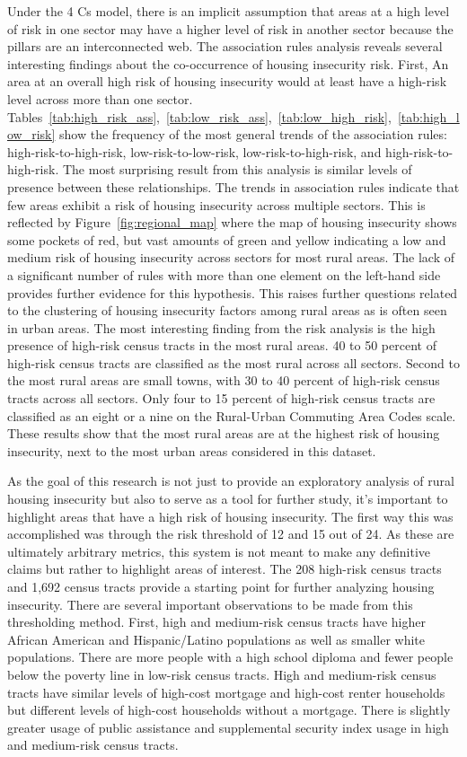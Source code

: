 Under the 4 Cs model, there is an implicit assumption that areas at a high level of risk in one sector may have a higher level of risk in another sector because the pillars are an interconnected web. The association rules analysis reveals several interesting findings about the co-occurrence of housing insecurity risk. First, An area at an overall high risk of housing insecurity would at least have a high-risk level across more than one sector. Tables~\ref{tab:high_risk_ass},~\ref{tab:low_risk_ass},~\ref{tab:low_high_risk},~\ref{tab:high_low_risk} show the frequency of the most general trends of the association rules: high-risk-to-high-risk, low-risk-to-low-risk, low-risk-to-high-risk, and high-risk-to-high-risk. The most surprising result from this analysis is similar levels of presence between these relationships. The trends in association rules indicate that few areas exhibit a risk of housing insecurity across multiple sectors. This is reflected by Figure~\ref{fig:regional_map} where the map of housing insecurity shows some pockets of red, but vast amounts of green and yellow indicating a low and medium risk of housing insecurity across sectors for most rural areas. The lack of a significant number of rules with more than one element on the left-hand side provides further evidence for this hypothesis. This raises further questions related to the clustering of housing insecurity factors among rural areas as is often seen in urban areas. The most interesting finding from the risk analysis is the high presence of high-risk census tracts in the most rural areas. 40 to 50 percent of high-risk census tracts are classified as the most rural across all sectors. Second to the most rural areas are small towns, with 30 to 40 percent of high-risk census tracts across all sectors. Only four to 15 percent of high-risk census tracts are classified as an eight or a nine on the Rural-Urban Commuting Area Codes scale. These results show that the most rural areas are at the highest risk of housing insecurity, next to the most urban areas considered in this dataset. 

As the goal of this research is not just to provide an exploratory analysis of rural housing insecurity but also to serve as a tool for further study, it's important to highlight areas that have a high risk of housing insecurity. The first way this was accomplished was through the risk threshold of 12 and 15 out of 24. As these are ultimately arbitrary metrics, this system is not meant to make any definitive claims but rather to highlight areas of interest. The 208 high-risk census tracts and 1,692 census tracts provide a starting point for further analyzing housing insecurity. There are several important observations to be made from this thresholding method. First, high and medium-risk census tracts have higher African American and Hispanic/Latino populations as well as smaller white populations. There are more people with a high school diploma and fewer people below the poverty line in low-risk census tracts. High and medium-risk census tracts have similar levels of high-cost mortgage and high-cost renter households but different levels of high-cost households without a mortgage. There is slightly greater usage of public assistance and supplemental security index usage in high and medium-risk census tracts. 

